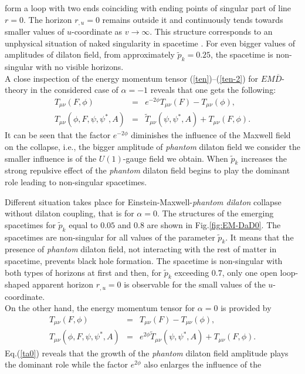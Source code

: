 \documentclass[aps,showpacs,nofootinbib,floatfix]{revtex4}
\newcommand{\ben}{\begin{eqnarray}}
\newcommand{\een}{\end{eqnarray}}
\newcommand{\tpe}{{\tilde p}}
\newcommand{\tT}{\tilde T}
\newcommand{\zpsi}{\psi^{\ast}}
\begin{document}
form a loop with two ends coinciding with ending points of singular part of line $r=0$. The horizon 
$r_{,u}=0$ remains outside it and continuously tends towards smaller values of $u$-coordinate 
as $v\rightarrow\infty$. This structure corresponds to an unphysical 
situation of naked singularity in spacetime \cite{hwa11}. For even bigger values 
of amplitudes of dilaton field, from approximately $\tpe_k=0.25$, the spacetime is non-singular with no visible horizons.\\
A close inspection of the energy momentum tensor (\ref{ten})--(\ref{ten-2}) for $EM\overline{D}$-theory 
in the considered case of $\alpha = -1$ reveals that one gets the following:
\ben \label{tt}
T_{\mu \nu}(F, \phi) &=& e^{- 2 \phi} T_{\mu \nu}(F) - T_{\mu \nu}(\phi), \\ \nonumber
T_{\mu \nu}(\phi, F, \psi, \zpsi, A) &=& \tT_{\mu \nu}(\psi, \zpsi, A) + T_{\mu \nu}(F, \phi).
\een
It can be seen that the factor $e^{- 2 \phi}$ diminishes the influence of the Maxwell field on the collapse, i.e.,
the bigger amplitude of {\it phantom} dilaton field we consider the smaller influence is of the $U(1)$-gauge field
we obtain. When $\tpe_k$ increases the strong repulsive effect of the {\it phantom} dilaton field begins to play the dominant role leading to non-singular spacetimes.
\par
Different situation takes place for Einstein-Maxwell-{\it phantom dilaton} collapse without 
dilaton coupling, that is for $\alpha=0$. The structures of the emerging 
spacetimes for $\tpe_k$ equal 
to $0.05$ and $0.8$ are shown in Fig.\ref{fig:EM-DaD0}. The spacetimes are non-singular for all 
values of the parameter $\tpe_k$. It means that the presence of {\it phantom}
dilaton field, not interacting with the rest of matter in spacetime, prevents black hole formation.  
The spacetime is non-singular with both types of horizons at first and then, for $\tpe_k$ exceeding 
$0.7$, only one open loop-shaped
apparent horizon $r_{,u}=0$ is observable for the small values of the $u$-coordinate.\\
On the other hand, the energy momentum tensor for $\alpha = 0$ is provided by
\ben \label{ta0}
T_{\mu \nu}(F, \phi) &=& T_{\mu \nu}(F) - T_{\mu \nu}(\phi), \\ \nonumber
T_{\mu \nu}(\phi, F, \psi, \zpsi, A) &=& e^{2 \phi} \tT_{\mu \nu}(\psi, \zpsi, A) + T_{\mu \nu}(F, \phi).
\een
Eq.(\ref{ta0}) reveals that the growth of the {\it phantom} dilaton field amplitude plays the dominant role
while the factor $e^{2 \phi}$ also enlarges the influence of the 
\end{document}
